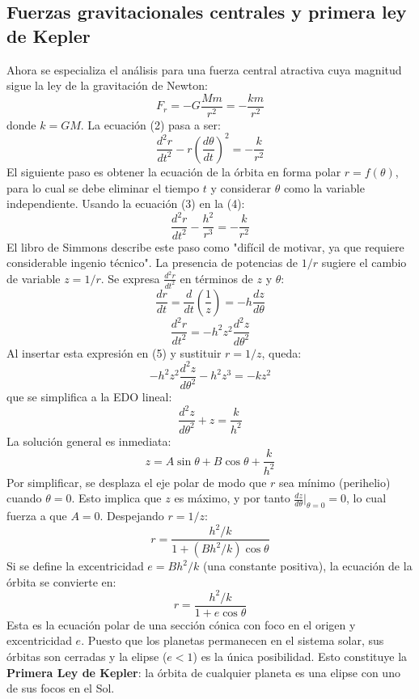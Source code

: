 \subsection{Fuerzas gravitacionales centrales y primera ley de Kepler}
Ahora se especializa el análisis para una fuerza central atractiva cuya magnitud sigue la ley de la gravitación de Newton:
\[ F_r = -G\frac{Mm}{r^2} = -\frac{km}{r^2} \]
donde $k=GM$. La ecuación (2) pasa a ser:
\begin{equation} \frac{d^2r}{dt^2} - r\left(\frac{d\theta}{dt}\right)^2 = -\frac{k}{r^2} \tag{4} \end{equation}
El siguiente paso es obtener la ecuación de la órbita en forma polar $r=f(\theta)$, para lo cual se debe eliminar el tiempo $t$ y considerar $\theta$ como la variable independiente. Usando la ecuación (3) en la (4):
\begin{equation} \frac{d^2r}{dt^2} - \frac{h^2}{r^3} = -\frac{k}{r^2} \tag{5} \end{equation}
El libro de Simmons describe este paso como "difícil de motivar, ya que requiere considerable ingenio técnico". La presencia de potencias de $1/r$ sugiere el cambio de variable $z=1/r$. Se expresa $\frac{d^2r}{dt^2}$ en términos de $z$ y $\theta$:
\[ \frac{dr}{dt} = \frac{d}{dt}\left(\frac{1}{z}\right) = -h\frac{dz}{d\theta} \]
\[ \frac{d^2r}{dt^2} = -h^2z^2\frac{d^2z}{d\theta^2} \]
Al insertar esta expresión en (5) y sustituir $r=1/z$, queda:
\[ -h^2z^2\frac{d^2z}{d\theta^2} - h^2z^3 = -kz^2 \]
que se simplifica a la EDO lineal:
\[ \frac{d^2z}{d\theta^2} + z = \frac{k}{h^2} \]
La solución general es inmediata:
\begin{equation} z = A\sin\theta + B\cos\theta + \frac{k}{h^2} \tag{6} \end{equation}
Por simplificar, se desplaza el eje polar de modo que $r$ sea mínimo (perihelio) cuando $\theta=0$. Esto implica que $z$ es máximo, y por tanto $\frac{dz}{d\theta}|_{\theta=0}=0$, lo cual fuerza a que $A=0$. Despejando $r=1/z$:
\[ r = \frac{h^2/k}{1 + (Bh^2/k)\cos\theta} \]
Si se define la excentricidad $e = Bh^2/k$ (una constante positiva), la ecuación de la órbita se convierte en:
\begin{equation} r = \frac{h^2/k}{1+e\cos\theta} \tag{7} \end{equation}
Esta es la ecuación polar de una sección cónica con foco en el origen y excentricidad $e$. Puesto que los planetas permanecen en el sistema solar, sus órbitas son cerradas y la elipse ($e<1$) es la única posibilidad. Esto constituye la \textbf{Primera Ley de Kepler}: la órbita de cualquier planeta es una elipse con uno de sus focos en el Sol.

